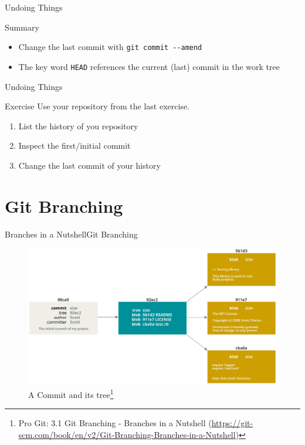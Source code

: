 \documentclass[aspectratio=169]{beamer}
\newcommand{\sectiontitle}{}
\newcommand{\newsection}[1]{\renewcommand{\sectiontitle}{#1}\section{#1}}
\begin{document}
\begin{frame}[fragile]{Undoing Things}{\sectiontitle}
\begin{block}{Summary}
\begin{itemize}
    \item Change the last commit with \verb|git commit --amend|
    \item The key word \verb|HEAD| references the current (last) commit in the work tree
\end{itemize}
\end{block}
\end{frame}

\begin{frame}[fragile]{Undoing Things}{\sectiontitle}
\begin{block}{Exercise}
Use your repository from the last exercise.
\begin{enumerate}
    \item List the history of you repository
    \item Inspect the first/initial commit
    \item Change the last commit of your history
\end{enumerate}
\end{block}
\end{frame}

\newsection{Git Branching}
\begin{frame}{Branches in a Nutshell}{\sectiontitle}
\begin{figure}
    \centering
    \includegraphics[width=\textwidth,height=0.6\textheight,keepaspectratio]{commit-and-tree}
    \caption{
        A Commit and its tree\footnote{
            Pro Git: 3.1 Git Branching - Branches in a Nutshell
            (\url{https://git-scm.com/book/en/v2/Git-Branching-Branches-in-a-Nutshell})
        }
    }
\end{figure}
\end{frame}
\end{document}
